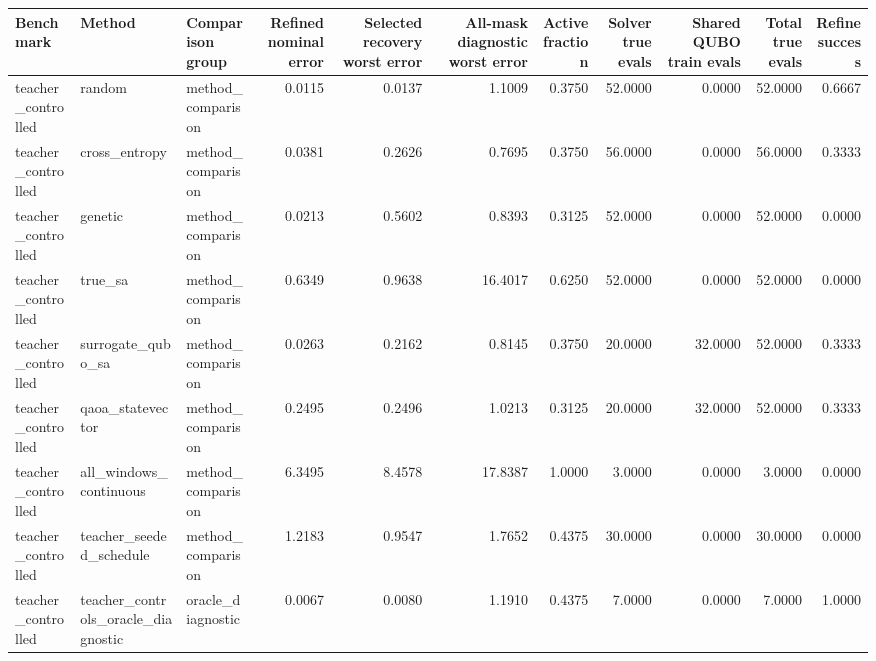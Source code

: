 \begin{tabular}{lllrrrrrrrr}
\toprule
Benchmark & Method & Comparison group & Refined nominal error & Selected recovery worst error & All-mask diagnostic worst error & Active fraction & Solver true evals & Shared QUBO train evals & Total true evals & Refine success \\
\midrule
teacher\_controlled & random & method\_comparison & 0.0115 & 0.0137 & 1.1009 & 0.3750 & 52.0000 & 0.0000 & 52.0000 & 0.6667 \\
teacher\_controlled & cross\_entropy & method\_comparison & 0.0381 & 0.2626 & 0.7695 & 0.3750 & 56.0000 & 0.0000 & 56.0000 & 0.3333 \\
teacher\_controlled & genetic & method\_comparison & 0.0213 & 0.5602 & 0.8393 & 0.3125 & 52.0000 & 0.0000 & 52.0000 & 0.0000 \\
teacher\_controlled & true\_sa & method\_comparison & 0.6349 & 0.9638 & 16.4017 & 0.6250 & 52.0000 & 0.0000 & 52.0000 & 0.0000 \\
teacher\_controlled & surrogate\_qubo\_sa & method\_comparison & 0.0263 & 0.2162 & 0.8145 & 0.3750 & 20.0000 & 32.0000 & 52.0000 & 0.3333 \\
teacher\_controlled & qaoa\_statevector & method\_comparison & 0.2495 & 0.2496 & 1.0213 & 0.3125 & 20.0000 & 32.0000 & 52.0000 & 0.3333 \\
teacher\_controlled & all\_windows\_continuous & method\_comparison & 6.3495 & 8.4578 & 17.8387 & 1.0000 & 3.0000 & 0.0000 & 3.0000 & 0.0000 \\
teacher\_controlled & teacher\_seeded\_schedule & method\_comparison & 1.2183 & 0.9547 & 1.7652 & 0.4375 & 30.0000 & 0.0000 & 30.0000 & 0.0000 \\
teacher\_controlled & teacher\_controls\_oracle\_diagnostic & oracle\_diagnostic & 0.0067 & 0.0080 & 1.1910 & 0.4375 & 7.0000 & 0.0000 & 7.0000 & 1.0000 \\
\bottomrule
\end{tabular}
